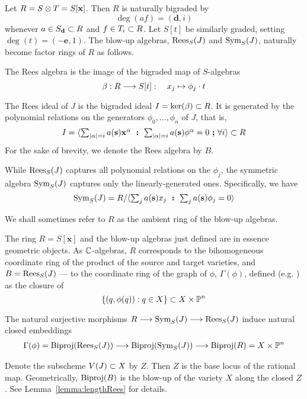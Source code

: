 \documentclass[fleqn,reqno]{amsart}
\begin{document}
\begin{paragraf}
\label{par:blowup-algebras}
Let $R=S\otimes T=S[\mathbf x]$. Then $R$ is naturally bigraded by
\[
	\deg(af)=(\mathbf d,i)
\]
whenever $a\in S_{\mathbf d}\subset R$ and $f\in T_i\subset R$.
Let $S[t]$ be similarly graded, setting $\deg(t)=(-\mathbf e,1)$.
The blow-up algebras, $\operatorname{Rees}_S(J)$ and $\operatorname{Sym}_S(J)$, naturally become
factor rings of $R$ as follows.

The Rees algebra is the image of the bigraded map of $S$-algebras
\[
	\beta:R\longrightarrow S[t]:\quad x_j\mapsto\phi_j\cdot t
\]

The Rees ideal of $J$ is the bigraded ideal $I=\ker(\beta)\subset R$.
It is generated by the polynomial relations on the generators $\phi_0,\ldots,\phi_n$ of $J$,
that is,
\[
	I=\langle \textstyle\sum_{|\alpha|=i} a(\mathbf s){\mathbf x}^{\alpha}
	~\boldsymbol:~
	\textstyle\sum_{|\alpha|=i} a(\mathbf s){\mathbf \phi}^{\alpha}=0
	~\boldsymbol;~\forall i\rangle\subset R
\]
For the sake of brevity, we denote the Rees algebra by $B$.

While $\operatorname{Rees}_S(J)$ captures all polynomial relations on the $\phi_j$,
the symmetric algebra $\operatorname{Sym}_S(J)$ captures only the linearly-generated ones.
Specifically, we have
\[
	\operatorname{Sym}_S(J)=R/\langle \textstyle\sum_j a(\mathbf s)x_j
	~\boldsymbol:~
	\textstyle\sum_j a(\mathbf s)\phi_j=0
	\rangle
\]

We shall sometimes refer to $R$ as the ambient ring of the blow-up algebras.
\end{paragraf}

\begin{paragraf}
\label{par:the-graph}
The ring $R=S[\mathbf x]$ and the blow-up algebras just defined are in essence geometric objects.
As $\mathbb{C}$-algebras, $R$ corresponds to the bihomogeneous coordinate ring of the product of
the source and target varieties,
and $B=\operatorname{Rees}_S(J)$ --- to the coordinate ring of the graph of $\phi$, $\Gamma(\phi)$,
defined (e.g. \citet{Har92}) as the closure of
\[
	\{(q,\phi(q)):q\in X\}\subset X\times \mathbb{P}^n
\]

The natural surjective morphisms $R\longrightarrow \operatorname{Sym}_S(J)\longrightarrow \operatorname{Rees}_S(J)$ induce natural closed embeddings
\begin{align}
\label{eq:R-Sym-B}
\Gamma(\phi)=\operatorname{Biproj}(\operatorname{Rees}_S(J))\longrightarrow \operatorname{Biproj}(\operatorname{Sym}_S(J))\longrightarrow \operatorname{Biproj}(R)=X\times \mathbb{P}^n
\end{align}
\end{paragraf}

\begin{paragraf}
\label{par:base-locus}
Denote the subscheme $V(J)\subset X$ by $Z$.
Then $Z$ is the base locus of the rational map.
Geometrically, $\operatorname{Biproj}(B)$ is the blow-up of the variety $X$ along the closed $Z$.
See Lemma~\ref{lemma:lengthRees} for details.
\end{paragraf}
\end{document}
